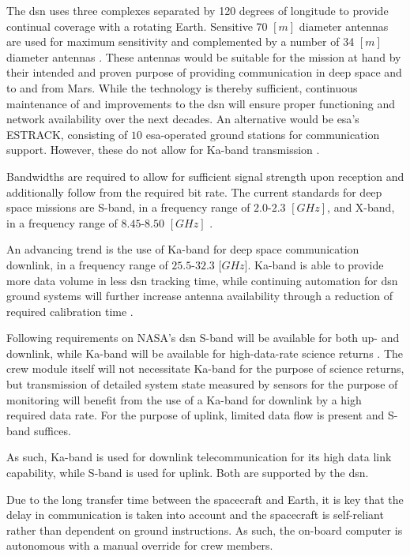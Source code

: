 The \gls{dsn} uses three complexes separated by 120 degrees of longitude to provide continual coverage with a rotating Earth. Sensitive 70 $[m]$ diameter antennas are used for maximum sensitivity and complemented by a number of 34 $[m]$ diameter antennas \cite{Wertz2011}. These antennas would be suitable for the mission at hand by their intended and proven purpose of providing communication in deep space and to and from Mars. While the technology is thereby sufficient, continuous maintenance of and improvements to the \gls{dsn} will ensure proper functioning and network availability over the next decades. An alternative would be \gls{esa}'s ESTRACK, consisting of $10$ \gls{esa}-operated ground stations for communication support. However, these do not allow for Ka-band transmission \cite[p.631]{Wertz2011}.

Bandwidths are required to allow for sufficient signal strength upon reception and additionally follow from the required bit rate. The current standards for deep space missions are S-band, in a frequency range of $2.0$-$2.3$ $[GHz]$, and X-band, in a frequency range of $8.45$-$8.50$ $[GHz]$ \cite{Wertz2011}.

An advancing trend is the use of Ka-band for deep space communication downlink, in a frequency range of $25.5$-$32.3$ [$GHz$]. Ka-band is able to provide more data volume in less \gls{dsn} tracking time, while continuing automation for \gls{dsn} ground systems will further increase antenna availability through a reduction of required calibration time \cite{Edwards1999}. 

Following requirements on NASA's \gls{dsn} S-band will be available for both up- and downlink, while Ka-band will be available for high-data-rate science returns \cite{Labelle2012}. The crew module itself will not necessitate Ka-band for the purpose of science returns, but transmission of detailed system state measured by sensors for the purpose of monitoring will benefit from the use of a Ka-band for downlink by a high required data rate. For the purpose of uplink, limited data flow is present and S-band suffices.%

As such, Ka-band is used for downlink telecommunication for its high data link capability, while S-band is used for uplink. Both are supported by the \gls{dsn}. 

Due to the long transfer time between the spacecraft and Earth, it is key that the delay in communication is taken into account and the spacecraft is self-reliant rather than dependent on ground instructions. As such, the on-board computer is autonomous with a manual override for crew members.